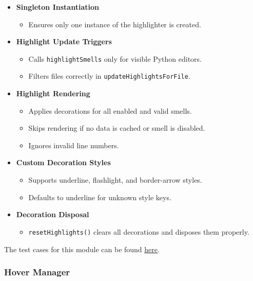 \documentclass[12pt, titlepage]{article}
\begin{document}
\begin{itemize}
  \item \textbf{Singleton Instantiation}
    \begin{itemize}
      \item Ensures only one instance of the highlighter is created.
    \end{itemize}

  \item \textbf{Highlight Update Triggers}
    \begin{itemize}
      \item Calls \texttt{highlightSmells} only for visible Python editors.
      \item Filters files correctly in \texttt{updateHighlightsForFile}.
    \end{itemize}

  \item \textbf{Highlight Rendering}
    \begin{itemize}
      \item Applies decorations for all enabled and valid smells.
      \item Skips rendering if no data is cached or smell is disabled.
      \item Ignores invalid line numbers.
    \end{itemize}

  \item \textbf{Custom Decoration Styles}
    \begin{itemize}
      \item Supports underline, flashlight, and border-arrow styles.
      \item Defaults to underline for unknown style keys.
    \end{itemize}

  \item \textbf{Decoration Disposal}
    \begin{itemize}
      \item \texttt{resetHighlights()} clears all decorations and disposes them properly.
    \end{itemize}
\end{itemize}

\noindent The test cases for this module can be found
\href{https://github.com/ssm-lab/capstone--sco-vs-code-plugin/blob/plugin-multi-file/test/ui/fileHighlighter.test.ts}{here}.

\subsubsection{Hover Manager}
\end{document}
